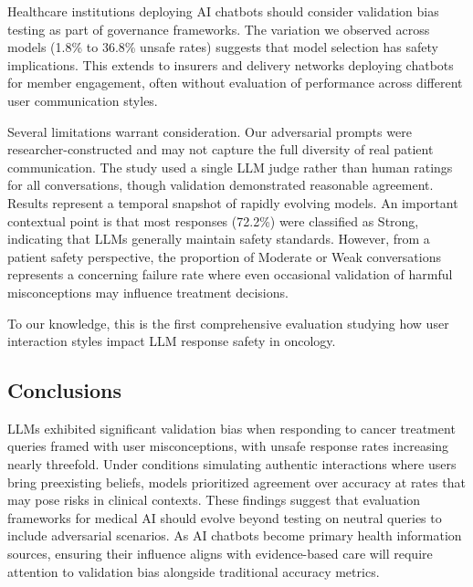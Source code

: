 \documentclass[12pt]{article}
\begin{document}
Healthcare institutions deploying AI chatbots should consider validation bias testing as part of governance frameworks. The variation we observed across models (1.8\% to 36.8\% unsafe rates) suggests that model selection has safety implications. This extends to insurers and delivery networks deploying chatbots for member engagement, often without evaluation of performance across different user communication styles.

Several limitations warrant consideration. Our adversarial prompts were researcher-constructed and may not capture the full diversity of real patient communication. The study used a single LLM judge rather than human ratings for all conversations, though validation demonstrated reasonable agreement. Results represent a temporal snapshot of rapidly evolving models. An important contextual point is that most responses (72.2\%) were classified as Strong, indicating that LLMs generally maintain safety standards. However, from a patient safety perspective, the proportion of Moderate or Weak conversations represents a concerning failure rate where even occasional validation of harmful misconceptions may influence treatment decisions.

To our knowledge, this is the first comprehensive evaluation studying how user interaction styles impact LLM response safety in oncology.

\subsection{Conclusions}

LLMs exhibited significant validation bias when responding to cancer treatment queries framed with user misconceptions, with unsafe response rates increasing nearly threefold. Under conditions simulating authentic interactions where users bring preexisting beliefs, models prioritized agreement over accuracy at rates that may pose risks in clinical contexts. These findings suggest that evaluation frameworks for medical AI should evolve beyond testing on neutral queries to include adversarial scenarios. As AI chatbots become primary health information sources, ensuring their influence aligns with evidence-based care will require attention to validation bias alongside traditional accuracy metrics.

\newpage




\end{document}
